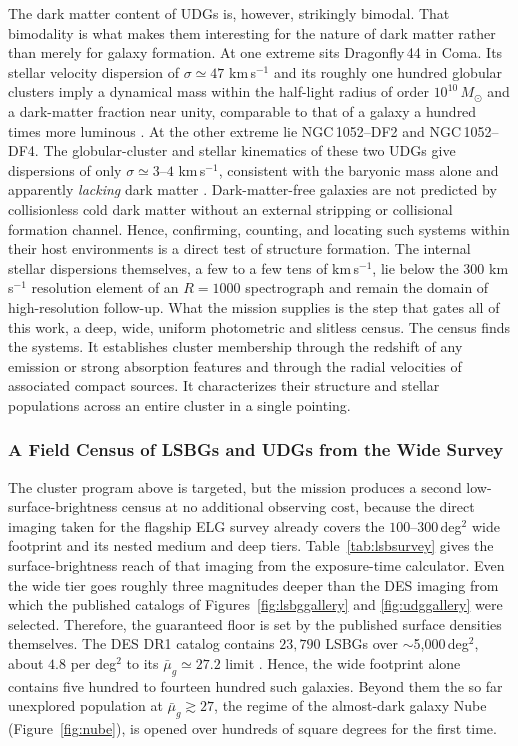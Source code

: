 \documentclass[10pt,onecolumn]{article}
\begin{document}
The dark matter content of UDGs is, however, strikingly bimodal. That bimodality is what makes them interesting for the nature of dark matter rather than merely for galaxy formation. At one extreme sits Dragonfly\,44 in Coma. Its stellar velocity dispersion of $\sigma\simeq47$ km\,s$^{-1}$ and its roughly one hundred globular clusters imply a dynamical mass within the half-light radius of order $10^{10}\,M_\odot$ and a dark-matter fraction near unity, comparable to that of a galaxy a hundred times more luminous \cite{vandokkum2016df44}. At the other extreme lie NGC\,1052--DF2 and NGC\,1052--DF4. The globular-cluster and stellar kinematics of these two UDGs give dispersions of only $\sigma\simeq3$--$4$ km\,s$^{-1}$, consistent with the baryonic mass alone and apparently \emph{lacking} dark matter \cite{vandokkum2018df2,vandokkum2019df4}. Dark-matter-free galaxies are not predicted by collisionless cold dark matter without an external stripping or collisional formation channel. Hence, confirming, counting, and locating such systems within their host environments is a direct test of structure formation. The internal stellar dispersions themselves, a few to a few tens of km\,s$^{-1}$, lie below the $300$ km\,s$^{-1}$ resolution element of an $R=1000$ spectrograph and remain the domain of high-resolution follow-up. What the mission supplies is the step that gates all of this work, a deep, wide, uniform photometric and slitless census. The census finds the systems. It establishes cluster membership through the redshift of any emission or strong absorption features and through the radial velocities of associated compact sources. It characterizes their structure and stellar populations across an entire cluster in a single pointing.

\subsubsection{A Field Census of LSBGs and UDGs from the Wide Survey}

The cluster program above is targeted, but the mission produces a second low-surface-brightness census at no additional observing cost, because the direct imaging taken for the flagship ELG survey already covers the $100$--$300$\,deg$^2$ wide footprint and its nested medium and deep tiers. Table~\ref{tab:lsbsurvey} gives the surface-brightness reach of that imaging from the exposure-time calculator. Even the wide tier goes roughly three magnitudes deeper than the DES imaging from which the published catalogs of Figures~\ref{fig:lsbggallery} and \ref{fig:udggallery} were selected. Therefore, the guaranteed floor is set by the published surface densities themselves. The DES DR1 catalog contains $23{,}790$ LSBGs over $\sim$5{,}000\,deg$^2$, about $4.8$ per deg$^2$ to its $\bar\mu_g\simeq27.2$ limit \cite{tanoglidis2021}. Hence, the wide footprint alone contains five hundred to fourteen hundred such galaxies. Beyond them the so far unexplored population at $\bar\mu_g\gtrsim27$, the regime of the almost-dark galaxy Nube (Figure~\ref{fig:nube}), is opened over hundreds of square degrees for the first time.
\end{document}
